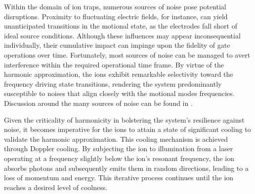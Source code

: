 \documentclass[
  journal=largetwo,
  year=2023,
]{cup-journal}
\begin{document}
Within the domain of ion traps, numerous sources of noise pose potential disruptions. Proximity to fluctuating electric fields, for instance, can yield unanticipated transitions in the motional state, as the electrodes fall short of ideal source conditions. Although these influences may appear inconsequential individually, their cumulative impact can impinge upon the fidelity of gate operations over time. Fortunately, most sources of noise can be managed to avert interference within the required operational time frame. By virtue of the harmonic approximation, the ions exhibit remarkable selectivity toward the frequency driving state transitions, rendering the system predominantly susceptible to noises that align closely with the motional modes frequencies.
Discussion around the many sources of noise can be found in \autocite{brownnutt_2015_iontrap}.

Given the criticality of harmonicity in bolstering the system's resilience against noise, it becomes imperative for the ions to attain a state of significant cooling to validate the harmonic approximation. This cooling mechanism is achieved through Doppler cooling. By subjecting the ion to illumination from a laser operating at a frequency slightly below the ion's resonant frequency, the ion absorbs photons and subsequently emits them in random directions, leading to a loss of momentum and energy. This iterative process continues until the ion reaches a desired level of coolness.

\noindent
\end{document}
